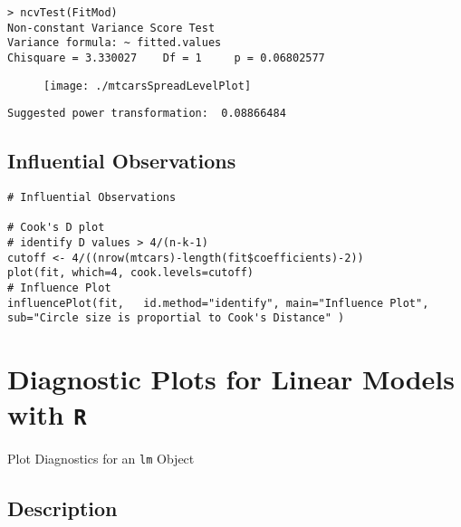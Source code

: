 \documentclass[main.tex]{subfiles}
\begin{document}
\begin{verbatim}
> ncvTest(FitMod)
Non-constant Variance Score Test 
Variance formula: ~ fitted.values 
Chisquare = 3.330027    Df = 1     p = 0.06802577 
\end{verbatim}


\begin{figure}[h!]
\centering
\texttt{[image: ./mtcarsSpreadLevelPlot]}
\label{mtcarsSpreadLevelPlot}
\end{figure}


\begin{verbatim}
Suggested power transformation:  0.08866484 
\end{verbatim}

\subsection{Influential Observations}
\begin{framed}
\begin{verbatim}
# Influential Observations

# Cook's D plot
# identify D values > 4/(n-k-1) 
cutoff <- 4/((nrow(mtcars)-length(fit$coefficients)-2)) 
plot(fit, which=4, cook.levels=cutoff)
# Influence Plot 
influencePlot(fit,	 id.method="identify", main="Influence Plot", sub="Circle size is proportial to Cook's Distance" )
\end{verbatim}
\end{framed}
\newpage
\section{Diagnostic Plots for Linear Models with \texttt{R}}
Plot Diagnostics for an \texttt{lm} Object

\subsection{Description}
\end{document}
